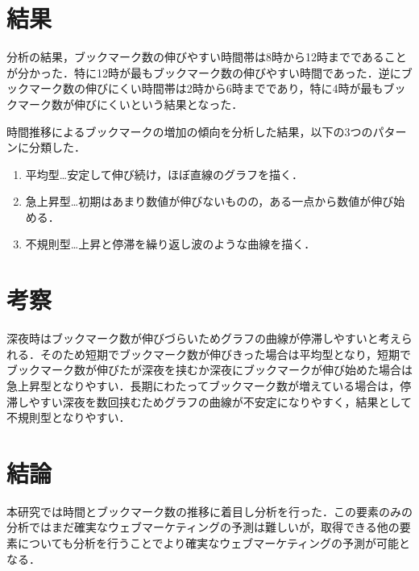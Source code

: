 \documentclass[uplatex,twocolumn,dvipdfmx]{jsarticle}
\begin{document}
\section{結果}
分析の結果，ブックマーク数の伸びやすい時間帯は8時から12時までであることが分かった．特に12時が最もブックマーク数の伸びやすい時間であった．逆にブックマーク数の伸びにくい時間帯は2時から6時までであり，特に4時が最もブックマーク数が伸びにくいという結果となった．\par
時間推移によるブックマークの増加の傾向を分析した結果，以下の3つのパターンに分類した．
\begin{enumerate}
\item 平均型…安定して伸び続け，ほぼ直線のグラフを描く．
\item 急上昇型…初期はあまり数値が伸びないものの，ある一点から数値が伸び始める．
\item 不規則型…上昇と停滞を繰り返し波のような曲線を描く． 
\end{enumerate}


\section{考察}
深夜時はブックマーク数が伸びづらいためグラフの曲線が停滞しやすいと考えられる．そのため短期でブックマーク数が伸びきった場合は平均型となり，短期でブックマーク数が伸びたが深夜を挟むか深夜にブックマークが伸び始めた場合は急上昇型となりやすい．長期にわたってブックマーク数が増えている場合は，停滞しやすい深夜を数回挟むためグラフの曲線が不安定になりやすく，結果として不規則型となりやすい．

\section{結論}
本研究では時間とブックマーク数の推移に着目し分析を行った．この要素のみの分析ではまだ確実なウェブマーケティングの予測は難しいが，取得できる他の要素についても分析を行うことでより確実なウェブマーケティングの予測が可能となる．



\end{document}
